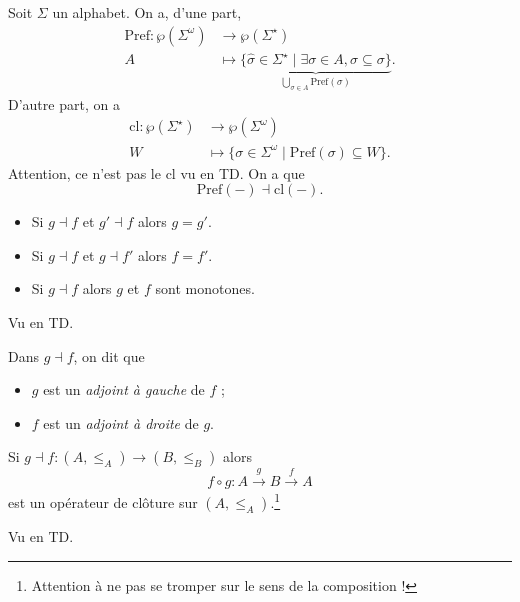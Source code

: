 \documentclass[./main]{subfiles}
\begin{document}
  \begin{exm}
    Soit $\Sigma$ un alphabet.
    On a, d'une part,
    \begin{align*}
      \mathrm{Pref}: \wp(\Sigma^\omega) &\longrightarrow \wp(\Sigma^\star) \\
      A &\longmapsto \underbrace{\{\hat{\sigma} \in \Sigma^\star  \mid \exists \sigma \in A, \hat{\sigma} \subseteq \sigma\}} _{\bigcup_{\sigma \in A} \mathrm{Pref}(\sigma) }
    .\end{align*}
    D'autre part, on a 
    \begin{align*}
      \mathrm{cl}: \wp(\Sigma^\star) &\longrightarrow \wp(\Sigma^\omega) \\
      W &\longmapsto \{\sigma \in \Sigma^\omega  \mid \mathrm{Pref}(\sigma) \subseteq W\} 
    .\end{align*}
    Attention, ce n'est pas le $\mathrm{cl}$ vu en TD.
    On a que
    \[
    \mathrm{Pref}(-) \dashv \mathrm{cl}(-)
    .\] 
  \end{exm}

  \begin{lem}
    \begin{itemize}
      \item Si $g \dashv f$ et $g' \dashv f$ alors $g = g'$.
      \item Si $g \dashv f$ et $g \dashv f'$ alors $f = f'$.
      \item Si $g \dashv f$ alors $g$ et $f$ sont monotones.
    \end{itemize}
  \end{lem}
  \begin{prv}
    Vu en TD.
  \end{prv}

  Dans $g \dashv f$, on dit que 
  \begin{itemize}
    \item $g$ est un \textit{adjoint à gauche} de $f$ ;
    \item $f$ est un \textit{adjoint à droite} de $g$.
  \end{itemize}

  \begin{lem}
    Si $g \dashv f : (A, \le_A) \to (B, \le_B)$ alors 
    \[
    f \circ g : A \overset g \longrightarrow B \overset f \longrightarrow A
    \] 
    est un opérateur de clôture sur $(A, \le_A)$.\footnote{Attention à ne pas se tromper sur le sens de la composition !}
  \end{lem}
  \begin{prv}
    Vu en TD.
  \end{prv}
\end{document}
